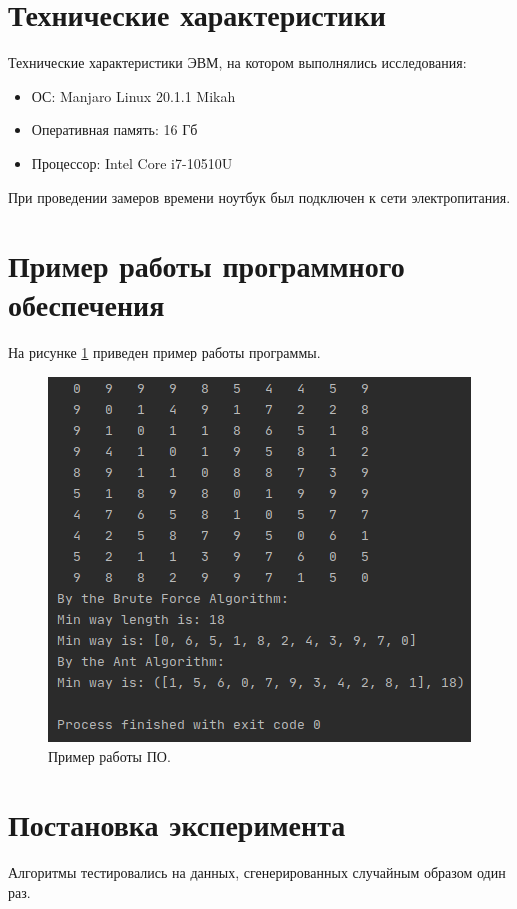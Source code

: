 \documentclass[12pt]{report}
\begin{document}
\section{Технические характеристики}
Технические характеристики ЭВМ, на котором выполнялись исследования:
\begin{itemize}
\item ОС: Manjaro Linux 20.1.1 Mikah
\item Оперативная память: 16 Гб
\item Процессор: Intel Core i7-10510U
\end{itemize}

При проведении замеров времени ноутбук был подключен к сети электропитания.

\section{Пример работы программного обеспечения}
На рисунке \ref{img:example} приведен пример работы программы.

\begin{figure}
\begin{center}
\includegraphics[scale=0.9]{inc/img/example.png}
\captionsetup{justification=centering}
	\caption{Пример работы ПО.}
	\label{img:example}	
\end{center}
\end{figure}

\newpage

\section{Постановка эксперимента}
Алгоритмы тестировались на данных, сгенерированных случайным образом один раз.
\end{document}
